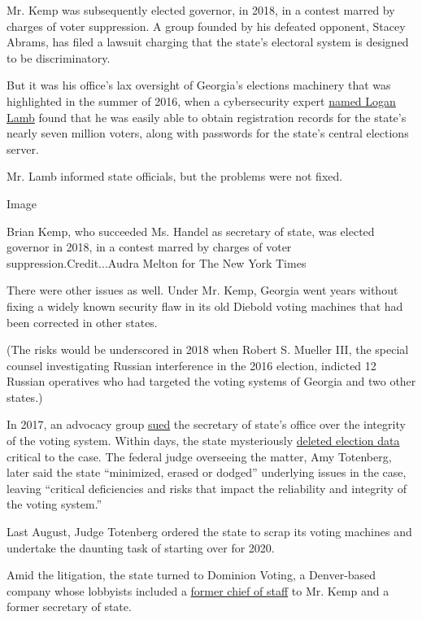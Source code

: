 Mr. Kemp was subsequently elected governor, in 2018, in a contest marred
by charges of voter suppression. A group founded by his defeated
opponent, Stacey Abrams, has filed a lawsuit charging that the state's
electoral system is designed to be discriminatory.

But it was his office's lax oversight of Georgia's elections machinery
that was highlighted in the summer of 2016, when a cybersecurity expert
\href{https://www.politico.com/magazine/story/2017/06/14/will-the-georgia-special-election-get-hacked-215255}{named
Logan Lamb} found that he was easily able to obtain registration records
for the state's nearly seven million voters, along with passwords for
the state's central elections server.

Mr. Lamb informed state officials, but the problems were not fixed.

Image

Brian Kemp, who succeeded Ms. Handel as secretary of state, was elected
governor in 2018, in a contest marred by charges of voter
suppression.Credit...Audra Melton for The New York Times

There were other issues as well. Under Mr. Kemp, Georgia went years
without fixing a widely known security flaw in its old Diebold voting
machines that had been corrected in other states.

(The risks would be underscored in 2018 when Robert S. Mueller III, the
special counsel investigating Russian interference in the 2016 election,
indicted 12 Russian operatives who had targeted the voting systems of
Georgia and two other states.)

In 2017, an advocacy group
\href{https://www.courthousenews.com/wp-content/uploads/2017/07/voting-atlanta.pdf}{sued}
the secretary of state's office over the integrity of the voting system.
Within days, the state mysteriously
\href{https://slate.com/technology/2017/10/georgia-destroyed-election-data-right-after-a-lawsuit-alleged-the-system-was-vulnerable.html}{deleted
election data} critical to the case. The federal judge overseeing the
matter, Amy Totenberg, later said the state ``minimized, erased or
dodged'' underlying issues in the case, leaving ``critical deficiencies
and risks that impact the reliability and integrity of the voting
system.''

Last August, Judge Totenberg ordered the state to scrap its voting
machines and undertake the daunting task of starting over for 2020.

Amid the litigation, the state turned to Dominion Voting, a Denver-based
company whose lobbyists included a
\href{http://media.ethics.ga.gov/search/Lobbyist/Lobbyist_Name.aspx?\&FilerID=L20070103}{former
chief of staff} to Mr. Kemp and a former secretary of state.

